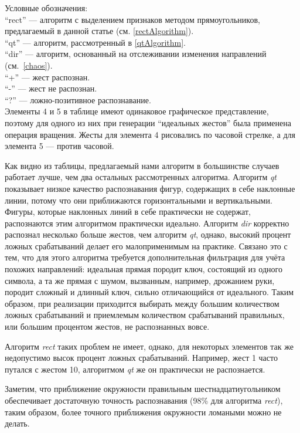 \documentclass[a5paper]{article}
\begin{document}
\newpage

Условные обозначения: \\
``rect'' --- алгоритм с выделением признаков методом прямоугольников, предлагаемый в данной статье (см. \ref{rectAlgorithm}).\\
``qt'' --- алгоритм, рассмотренный в \ref{qtAlgorithm}. \\
``dir'' --- алгоритм, основанный на отслеживании изменения направлений (см.~\ref{chaos}). \\
``+'' --- жест распознан. \\
``-'' --- жест не распознан. \\
``?'' --- ложно-позитивное распознавание. \\

Элементы 4 и 5 в таблице имеют одинаковое графическое представление, поэтому для одного из них при генерации ``идеальных жестов'' была применена операция вращения. Жесты для элемента 4 рисовались по часовой стрелке, а для элемента 5 --- против часовой.

Как видно из таблицы, предлагаемый нами алгоритм в большинстве случаев работает лучше, чем два остальных рассмотренных алгоритма. Алгоритм \textit{qt} показывает низкое качество распознавания фигур, содержащих в себе наклонные линии, потому что они приближаются горизонтальными и вертикальными. Фигуры, которые наклонных линий в себе практически не содержат, распознаются этим алгоритмом практически идеально. Алгоритм \textit{dir} корректно распознал несколько больше жестов, чем алгоритм \textit{qt}, однако, высокий процент ложных срабатываний делает его малоприменимым на практике. Связано это с тем, что для этого алгоритма требуется дополнительная фильтрация для учёта похожих направлений: идеальная прямая породит ключ, состоящий из одного символа, а та же прямая с шумом, вызванным, например, дрожанием руки, породит сложный и длинный ключ, сильно отличающийся от идеального. Таким образом, при реализации приходится выбирать между большим количеством ложных срабатываний и приемлемым количеством срабатываний правильных, или большим процентом жестов, не распознанных вовсе.

Алгоритм \textit{rect} таких проблем не имеет, однако, для некоторых элементов так же недопустимо высок процент ложных срабатываний. Например, жест 1 часто путался с жестом 10, алгоритмом \textit{qt} же он практически не распознается. 

Заметим, что приближение окружности правильным шестнадцатиугольником обеспечивает достаточную точность распознавания (98\% для алгоритма \textit{rect}), таким образом, более точного приближения окружности ломаными можно не делать.
\end{document}
